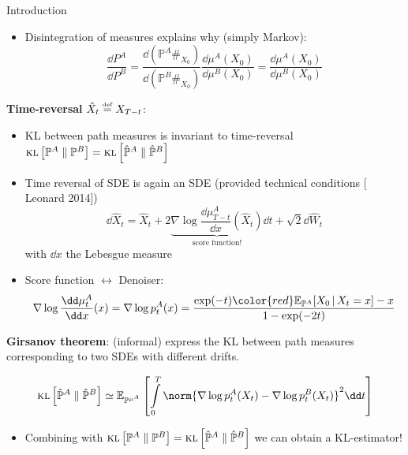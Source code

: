 \begin{frame}[allowframebreaks]{Introduction}
\begin{itemize}
\begin{equation}
 \KL{\mathbb{P}^{A}}{\mathbb{P}^{B}}=\E_{\mathbb{P}^{A}}\left[\log\frac{\dd\mathbb{P}^{A}}{\dd\mathbb{P}^{B}}\right]=\E_{\mathbb{P}^{A}}\left[\log\frac{\dd \mu^{A}}{\dd p^{B}}\right]=\KL{\mu^A}{\mu^B}  
\end{equation}
\item Disintegration of measures explains why (simply Markov): \[\frac{\dd {P}^{A}}{\dd {P}^{B}}=\frac{\dd \left(\mathbb{P}^{A}\#_{X_{0}}\right)}{\dd \left(\mathbb{P}^{B}\#_{X_{0}}\right)}\frac{\dd \mu^A(X_{0})}{\dd \mu^B(X_{0})}=\frac{\dd \mu^A(X_{0})}{\dd \mu^B(X_{0})}\]
\end{itemize}  
\framebreak
\textbf{Time-reversal} $\hat{X}_t\stackrel{\text{\tiny def}}{=} X_{T-t}$:
\begin{itemize}
    \item KL between path measures is invariant to time-reversal $\textsc{kl}\left[\mathbb{P}^{A}\;\|\;\mathbb{P}^{B}\right]=\textsc{kl}\left[\hat{\mathbb{P}}^{A}\;\|\;\hat{\mathbb{P}}^{B}\right]$
    \item Time reversal of SDE is again an SDE (provided technical conditions [ Leonard 2014])
    \begin{equation}
         \dd \hat X_t=\hat X_t+2 \underbrace{\nabla\log \frac{\dd\mu_{T-t}^A}{\dd x}(\hat X_t)}_{\text{score function!}}\dd t+ \sqrt{2}\dd \hat W_t
    \end{equation}
    with $\dd x$ the Lebesgue measure
    \item Score function $\leftrightarrow$ Denoiser: \begin{equation}
        \nabla\log \frac{\dd\mu_t^A}{\dd x}(x)=\nabla\log p^A_t(x)=\frac{ \exp(-t){\color{red}\E_{{\mathbb{P}^{A}}}[X_0\g X_t=x]}-x}{1-\exp(-2t)}
    \end{equation}
\end{itemize}


\framebreak
\textbf{Girsanov theorem}: (informal) express the KL between path measures corresponding to two \glspl{SDE} with different drifts.

\begin{equation}
 \KL{\hat{\mathbb{P}}^{A}}{\hat{\mathbb{P}}^{B}}\simeq  \E_{   {\mathbb{P}}^{\mu^A}}\left[\int\limits_0^T\norm{\nabla\log p^{A}_t(X_t)-\nabla\log p^{B}_t(X_t) }^2\dd t\right]
\end{equation}
\begin{itemize}
    \item Combining with $\textsc{kl}\left[\mathbb{P}^{A}\;\|\;\mathbb{P}^{B}\right]=\textsc{kl}\left[\hat{\mathbb{P}}^{A}\;\|\;\hat{\mathbb{P}}^{B}\right]$ we can obtain a KL-estimator!
\end{itemize}





\end{frame}
